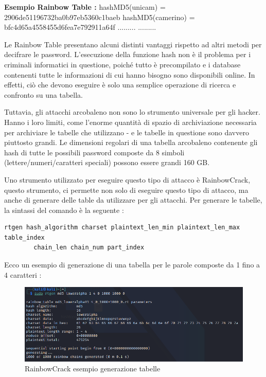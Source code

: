 \textbf{Esempio Rainbow Table :}
\newline
\newline
hashMD5(unicam) = 2906de51196732ba0b97eb5360c1baeb\newline
hashMD5(camerino) = bfc4d65a4558455d6fea7e792911a64f\newline
.........\newline
.........\newline

Le Rainbow Table presentano alcuni distinti vantaggi rispetto ad altri metodi per decifrare le password. L'esecuzione della funzione hash non è il problema per i criminali informatici in questione, poiché tutto è precompilato e i database contenenti tutte le informazioni di cui hanno bisogno sono disponibili online. In effetti, ciò che devono eseguire è solo una semplice operazione di ricerca e confronto su una tabella.

Tuttavia, gli attacchi arcobaleno non sono lo strumento universale per gli hacker. Hanno i loro limiti, come l'enorme quantità di spazio di archiviazione necessaria per archiviare le tabelle che utilizzano - e le tabelle in questione sono davvero piuttosto grandi. Le dimensioni regolari di una tabella arcobaleno contenente gli hash di tutte le possibili password composte da 8 simboli (lettere/numeri/caratteri speciali) possono essere grandi 160 GB.

Uno strumento utilizzato per eseguire questo tipo di attacco è RainbowCrack\cite{rainbowcrack}, questo strumento, ci permette non solo di eseguire questo tipo di attacco, ma anche di generare delle table da utilizzare per gli attacchi. Per generare le tabelle, la sintassi del comando è la seguente :

\begin{lstlisting}[caption={RainbowCrack generazione tabelle}, style=javaScriptCode]
rtgen hash_algorithm charset plaintext_len_min plaintext_len_max table_index 
        chain_len chain_num part_index
\end{lstlisting}

Ecco un esempio di generazione di una tabella per le parole composte da 1 fino a 4 caratteri :

\begin{figure}[h!]
    \centering
    \includegraphics[width=120mm]{Immagini/1/r_1.png}
    \caption{RainbowCrack esempio generazione tabelle}
\end{figure}

